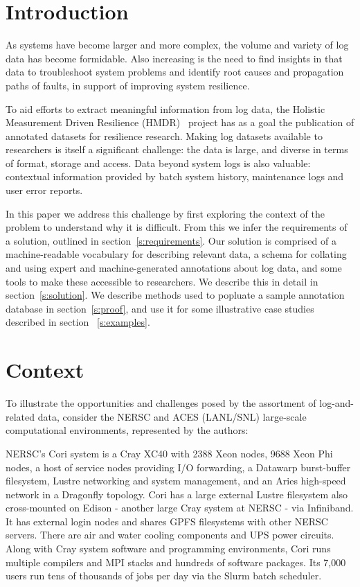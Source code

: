 \section{Introduction}
\label{s:intro}

As systems have become larger and more complex, the volume and variety of 
log data has become formidable. Also increasing is the need to find insights 
in that data to troubleshoot system problems and identify root causes and 
propagation paths of faults, in support of improving system resilience.

To aid efforts to extract meaningful information from log data, the Holistic Measurement Driven Resilience (HMDR)~\cite{HMDRweb} project has as a goal
the publication of annotated datasets for resilience 
research. Making log datasets available to researchers is itself a significant
challenge: the data is large, and diverse in terms of format, storage 
and access. Data beyond system logs is also valuable: contextual information
provided by batch system history, maintenance logs and user error reports.

In this paper we address this challenge by first exploring the context of the
problem to understand why it is difficult. From this we infer 
the requirements of a solution, outlined in section~\ref{s:requirements}. Our
solution is comprised of a machine-readable vocabulary for describing 
relevant data, a schema for collating and using expert and 
machine-generated annotations about log data, and some tools to make these 
accessible to researchers. We describe this in detail in section~\ref{s:solution}. 
We describe methods used to popluate a sample annotation database in 
section~\ref{s:proof}, and use it for some illustrative case studies described 
in section ~\ref{s:examples}.

\section{Context}
\label{s:context}

To illustrate the opportunities and challenges posed by the assortment of 
log-and-related data, consider the NERSC and ACES (LANL/SNL) large-scale computational environments, represented by the authors:

NERSC's Cori system is a Cray XC40 with 2388 Xeon nodes, 9688 Xeon Phi nodes, 
a host of service nodes providing I/O forwarding, a Datawarp
burst-buffer filesystem, Lustre networking and
system management, and an Aries high-speed network in a Dragonfly topology. Cori
has a large external Lustre filesystem also cross-mounted on Edison - another 
large Cray system at NERSC - via Infiniband. It has external login nodes and 
shares GPFS filesystems with other NERSC servers. There are air and water cooling
components and UPS power circuits. Along with Cray system software and 
programming environments, Cori runs multiple compilers and MPI stacks and
hundreds of software packages. Its 7,000 users run tens of thousands of jobs per 
day via the Slurm batch scheduler.

